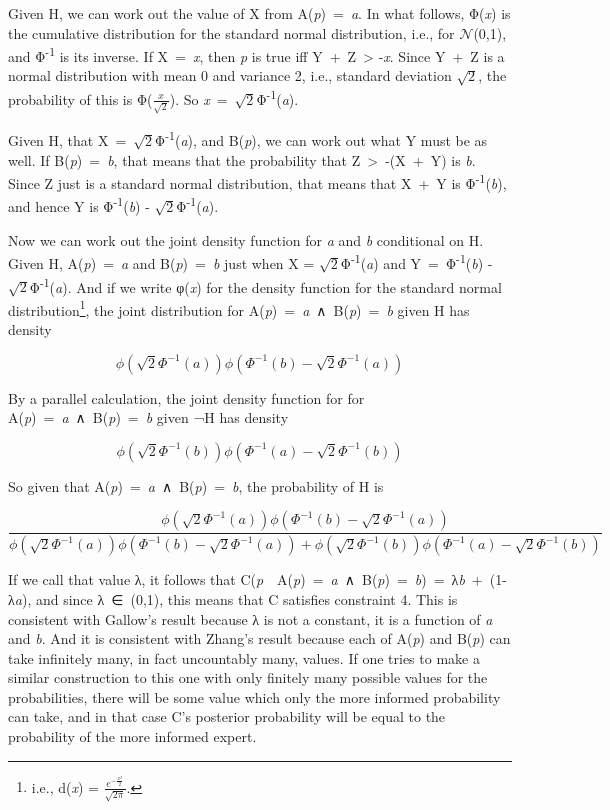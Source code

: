 \documentclass[
  10pt,
  letterpaper,
  DIV=11,
  numbers=noendperiod,
  twoside]{scrartcl}
\begin{document}
Given H, we can work out the value of X from A(\emph{p})~=~\emph{a}. In
what follows, Φ(\emph{x}) is the cumulative distribution for the
standard normal distribution, i.e., for \(\mathcal{N}\)(0,1), and
Φ\textsuperscript{-1} is its inverse. If X~=~\emph{x}, then \emph{p} is
true iff Y~+~Z~\textgreater{} -\emph{x}. Since Y~+~Z is a normal
distribution with mean 0 and variance 2, i.e., standard deviation
\(\sqrt{2}\), the probability of this is Φ(\(\frac{x}{\sqrt{2}}\)). So
\emph{x}~=~\(\sqrt{2}\)Φ\textsuperscript{-1}(\emph{a}).

Given H, that X~=~\(\sqrt{2}\)Φ\textsuperscript{-1}(\emph{a}), and
B(\emph{p}), we can work out what Y must be as well. If
B(\emph{p})~=~\emph{b}, that means that the probability that
Z~\textgreater~-(X~+~Y) is \emph{b}. Since Z just is a standard normal
distribution, that means that X~+~Y is Φ\textsuperscript{-1}(\emph{b}),
and hence Y is Φ\textsuperscript{-1}(\emph{b}) -
\(\sqrt{2}\)Φ\textsuperscript{-1}(\emph{a}).

Now we can work out the joint density function for \emph{a} and \emph{b}
conditional on H. Given H, A(\emph{p})~=~\emph{a} and
B(\emph{p})~=~\emph{b} just when X =
\(\sqrt{2}\)Φ\textsuperscript{-1}(\emph{a}) and
Y~=~Φ\textsuperscript{-1}(\emph{b}) -
\(\sqrt{2}\)Φ\textsuperscript{-1}(\emph{a}). And if we write φ(\emph{x})
for the density function for the standard normal
distribution\footnote{i.e., d(\emph{x}) =
  \(\frac{e^{-\frac{x^2}{2}}}{\sqrt{2\pi}}\).}, the joint distribution
for A(\emph{p})~=~\emph{a}~∧~B(\emph{p})~=~\emph{b} given H has density

\[
\phi(\sqrt{2}\Phi^{-1}(a)) \phi(Φ^{-1}(b) - \sqrt{2}Φ^{-1}(a))
\]

By a parallel calculation, the joint density function for for
A(\emph{p})~=~\emph{a}~∧~B(\emph{p})~=~\emph{b} given ¬H has density

\[
\phi(\sqrt{2}\Phi^{-1}(b)) \phi(Φ^{-1}(a) - \sqrt{2}Φ^{-1}(b))
\]

So given that A(\emph{p})~=~\emph{a}~∧~B(\emph{p})~=~\emph{b}, the
probability of H is

\[
\frac{
\phi(\sqrt{2}\Phi^{-1}(a)) \phi(Φ^{-1}(b) - \sqrt{2}Φ^{-1}(a))
}{
\phi(\sqrt{2}\Phi^{-1}(a)) \phi(Φ^{-1}(b) - \sqrt{2}Φ^{-1}(a)) + \phi(\sqrt{2}\Phi^{-1}(b)) \phi(Φ^{-1}(a) - \sqrt{2}Φ^{-1}(b))
}
\]

If we call that value λ, it follows that
C(\emph{p}~\textbar~A(\emph{p})~=~\emph{a}~∧~B(\emph{p})~=~\emph{b})~=~λ\emph{b}~+~(1-λ\emph{a}),
and since λ~∈~(0,1), this means that C satisfies constraint 4. This is
consistent with Gallow's result because λ is not a constant, it is a
function of \emph{a} and \emph{b}. And it is consistent with Zhang's
result because each of A(\emph{p}) and B(\emph{p}) can take infinitely
many, in fact uncountably many, values. If one tries to make a similar
construction to this one with only finitely many possible values for the
probabilities, there will be some value which only the more informed
probability can take, and in that case C's posterior probability will be
equal to the probability of the more informed expert.
\end{document}
